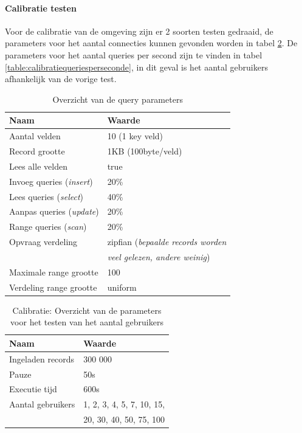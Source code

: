 \paragraph{Calibratie testen} Voor de calibratie van de omgeving zijn er 2 soorten testen gedraaid, de parameters voor het aantal connecties kunnen gevonden worden in tabel \ref{table:calibratiegebruikers}. De parameters voor het aantal queries per second zijn te vinden in tabel \ref{table:calibratiequeriesperseconde}, in dit geval is het aantal gebruikers afhankelijk van de vorige test. 

\begin{table}[h!]
	\centering
	\begin{tabular}{l| l }
	\textbf{Naam} & \textbf{Waarde} \\
	\hline
	Aantal velden & 10 (1 key veld) \\
	Record grootte & 1KB (100byte/veld) \\
	Lees alle velden & true \\
	Invoeg queries (\textit{insert}) & 20\%\\
	Lees queries (\textit{select}) & 40\%\\
	Aanpas queries (\textit{update}) & 20\%\\
	Range queries (\textit{scan}) & 20\%\\
	Opvraag verdeling & zipfian (\textit{bepaalde records worden} \\
	& \textit{veel gelezen, andere weinig}) \\
	Maximale range grootte & 100 \\
	Verdeling range grootte & uniform \\
	\end{tabular}
	\caption{Overzicht van de query parameters}
	\label{table:calibratiequeries}
\end{table}

\begin{table}[h!]
	\centering
	\begin{tabular}{l| l}
	\textbf{Naam} & \textbf{Waarde}  \\
	\hline
	Ingeladen records  & 300 000 \\
	Pauze & 50s \\
	Executie tijd & 600s \\
	Aantal gebruikers & 1, 2, 3, 4, 5, 7, 10, 15, \\
	& 20, 30, 40, 50, 75, 100\\
	\end{tabular}
	\caption{Calibratie: Overzicht van de parameters voor het testen van het aantal gebruikers}
	\label{table:calibratiegebruikers}
\end{table}


